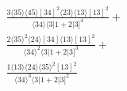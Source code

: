 \documentclass[varwidth, border=5pt]{standalone}
\begin{document}
\begin{my}
$\begin{gathered}
\scriptscriptstyle\frac{3⟨35⟩⟨45⟩[34]^2⟨23⟩⟨13⟩[13]^2}{⟨34⟩⟨3|1+2|3]^4}+\\
\scriptscriptstyle\frac{2⟨35⟩^2⟨24⟩[34]⟨13⟩[13]^2}{⟨34⟩^2⟨3|1+2|3]^3}+\\
\scriptscriptstyle\frac{1⟨13⟩⟨24⟩⟨35⟩^2[13]^2}{⟨34⟩^3⟨3|1+2|3]^2}\phantom{+}
\end{gathered}$
\end{my}
\end{document}
